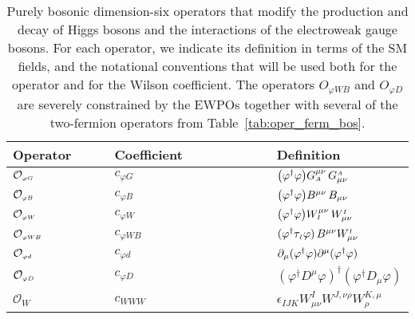 \begin{table}[t] 
  \begin{center}
    \renewcommand{\arraystretch}{1.90}
        \begin{tabular}{lll}
          \toprule
          Operator $\qquad$ & Coefficient $\qquad\qquad\qquad$ & Definition \\
        \midrule
        $\mathcal{O}_{\scriptscriptstyle \varphi G}$ & $c_{\varphi G}$  & $\left(\pdp\right)G^{\mu\nu}_{\sss A}\,
        G_{\mu\nu}^{\sss A}$  \\ \hline
        $\mathcal{O}_{\scriptscriptstyle \varphi B}$ & $c_{\varphi B}$ & $\left(\pdp\right)B^{\mu\nu}\,B_{\mu\nu}$\\ \hline
        $\mathcal{O}_{\scriptscriptstyle \varphi W}$ &$c_{\varphi W}$ & $\left(\pdp\right)W^{\mu\nu}_{\sss I}\,
        W_{\mu\nu}^{\sss I}$ \\ \hline
        $\mathcal{O}_{\scriptscriptstyle \varphi W B}$ &$c_{\varphi W B}$ & $(\varphi^\dagger \tau_{\scriptscriptstyle I}\varphi)\,B^{\mu\nu}W_{\mu\nu}^{\scriptscriptstyle I}\,$ \\ \hline
        $\mathcal{O}_{\scriptscriptstyle \varphi d}$ & $c_{\varphi d}$ & $\partial_\mu(\varphi^\dagger\varphi)\partial^\mu(\varphi^\dagger\varphi)$ \\ \hline
        $\mathcal{O}_{\scriptscriptstyle \varphi D}$ & $c_{\varphi D}$ & $(\varphi^\dagger D^\mu\varphi)^\dagger(\varphi^\dagger D_\mu\varphi)$ \\ \hline
         $\mathcal{O}_{W}$&   $c_{WWW}$ & $\epsilon_{IJK}W_{\mu\nu}^I W^{J,\nu\rho} W^{K,\mu}_\rho$ \\
       \bottomrule
        \end{tabular}
        \caption{Purely bosonic dimension-six operators that
          modify the production and decay of Higgs bosons and
          the interactions of the electroweak gauge bosons.
          For each operator, we indicate its definition in terms of the SM
          fields,
          and the notational conventions that will be used
          both for the operator and for the Wilson coefficient.
          The operators $O_{\varphi WB}$ and $O_{\varphi D}$
          are severely
          constrained by the EWPOs together with several of
          the two-fermion operators from Table~\ref{tab:oper_ferm_bos}.
           \label{tab:oper_bos}}
\end{center}
\end{table}
